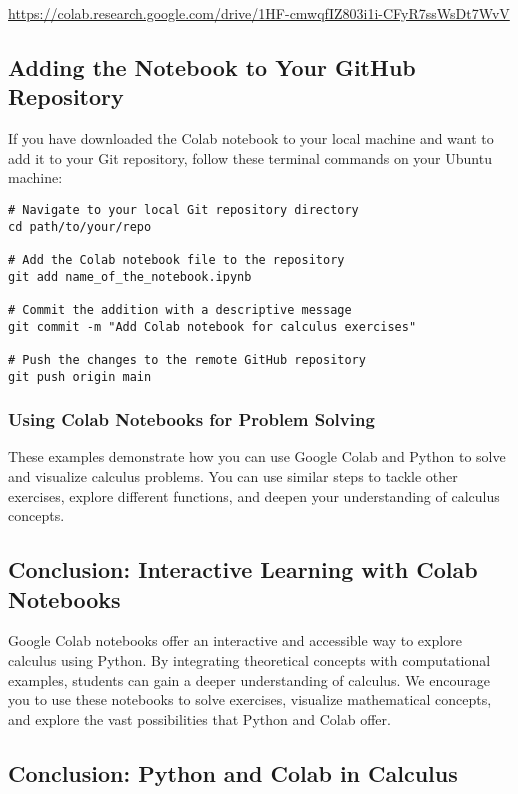 \documentclass[a4paper,12pt]{book}
\newcounter{problem}
\newcounter{example}
\begin{document}
\url{https://colab.research.google.com/drive/1HF-cmwqfIZ803i1i-CFyR7ssWsDt7WvV}

\subsection*{Adding the Notebook to Your GitHub Repository}

If you have downloaded the Colab notebook to your local machine and want to add it to your Git repository, follow these terminal commands on your Ubuntu machine:

\begin{verbatim}
# Navigate to your local Git repository directory
cd path/to/your/repo

# Add the Colab notebook file to the repository
git add name_of_the_notebook.ipynb

# Commit the addition with a descriptive message
git commit -m "Add Colab notebook for calculus exercises"

# Push the changes to the remote GitHub repository
git push origin main
\end{verbatim}


\subsubsection*{Using Colab Notebooks for Problem Solving}
These examples demonstrate how you can use Google Colab and Python to solve and visualize calculus problems. You can use similar steps to tackle other exercises, explore different functions, and deepen your understanding of calculus concepts.

\subsection*{Conclusion: Interactive Learning with Colab Notebooks}

Google Colab notebooks offer an interactive and accessible way to explore calculus using Python. By integrating theoretical concepts with computational examples, students can gain a deeper understanding of calculus. We encourage you to use these notebooks to solve exercises, visualize mathematical concepts, and explore the vast possibilities that Python and Colab offer.


\subsection*{Conclusion: Python and Colab in Calculus}
\end{document}
